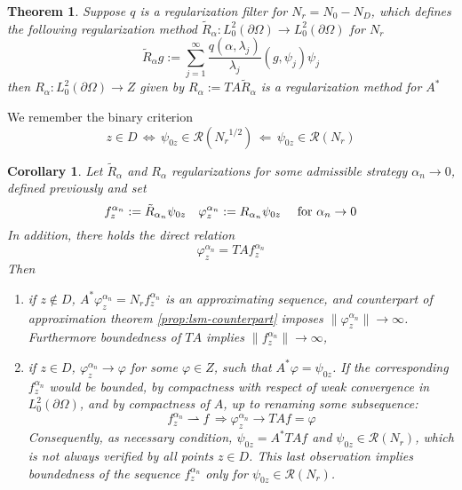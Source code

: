 \documentclass[10pt, a4paper, twoside, openright]{book}
\theoremstyle{definition}
\theoremstyle{plain}
\newtheorem{theorem}[subsection]{Theorem}
\theoremstyle{plain}
\newtheorem{corollary}[subsection]{Corollary}
\theoremstyle{plain}
\theoremstyle{plain}
\theoremstyle{plain}
\theoremstyle{plain}
\theoremstyle{plain}
\theoremstyle{plain}
\let\phi\varphi
\begin{document}
\begin{theorem}
 Suppose $q$ is a regularization filter for ${N_r} = {N_0}- {N_D}$, which defines the following regularization method $\tilde{R}_\alpha : L^2_0(\partial \Omega) \to L^2_0(\partial\Omega)$ for ${N_r}$
 \begin{equation}
  \tilde{R}_\alpha g := \sum_{j=1}^\infty\frac{q(\alpha,\lambda_j)}{\lambda_j}(g,\psi_j)\psi_j
 \end{equation}
 then $R_\alpha : L^2_0(\partial\Omega) \to Z$  given by $R_\alpha:=TA\tilde{R}_\alpha$ is a regularization method for $A^*$
\end{theorem}
We remember the binary criterion
\begin{equation}
 z\in D \,\Longleftrightarrow \, \psi_{0z}\in\mathcal{R}({N_r}^{1/2})\, \Longleftarrow \,\psi_{0z}\in\mathcal{R}({N_r})
\end{equation}

\begin{corollary}
 Let $\tilde{R}_\alpha$ and $R_\alpha$ regularizations for some admissible strategy $\alpha_n\to 0$, defined previously and set
 \begin{equation}
  f_z^{\alpha_n}:=\tilde{R}_{\alpha_n}\psi_{0z}\quad \phi_z^{\alpha_n}:=R_{\alpha_n}\psi_{0z}\quad\textup{ for }\alpha_n \to 0
 \end{equation}
 In addition, there holds the direct relation
 \begin{equation}
  \phi_z^{\alpha_n} = TAf_z^{\alpha_n}
 \end{equation}
Then
\begin{enumerate}
 \item if $z\notin D$, $A^*\phi_z^{\alpha_n} = {N_r}f_z^{\alpha_n}$ is an approximating sequence, and counterpart of approximation theorem \ref{prop:lsm-counterpart} imposes $\|\phi_z^{\alpha_n}\|\to\infty$. Furthermore boundedness of $TA$ implies $\|f_z^{\alpha_n}\|\to\infty$,
 \item if $z \in D$, $\phi_z^{\alpha_n}\to \phi$ for some $\phi\in Z$, such that $A^*\phi = \psi_{0z}$. If the corresponding $f_z^{\alpha_n}$ would be bounded, by compactness with respect of weak convergence in $L^2_0(\partial\Omega)$, and by compactness of $A$, up to renaming some subsequence:
 \begin{equation}
  f_z^{\alpha_n}\rightharpoonup f \,\Rightarrow \phi_z^{\alpha_n} \to TA f = \phi
 \end{equation}
Consequently, as necessary condition, $\psi_{0z}=A^*TAf$ and $\psi_{0z}\in\mathcal{R}({N_r})$, which is not always verified by all points $z\in D$.
This last observation implies boundedness of the sequence $f_z^{\alpha_n}$ only for $\psi_{0z}\in\mathcal{R}({N_r})$.
\end{enumerate}
\end{corollary}
\end{document}
